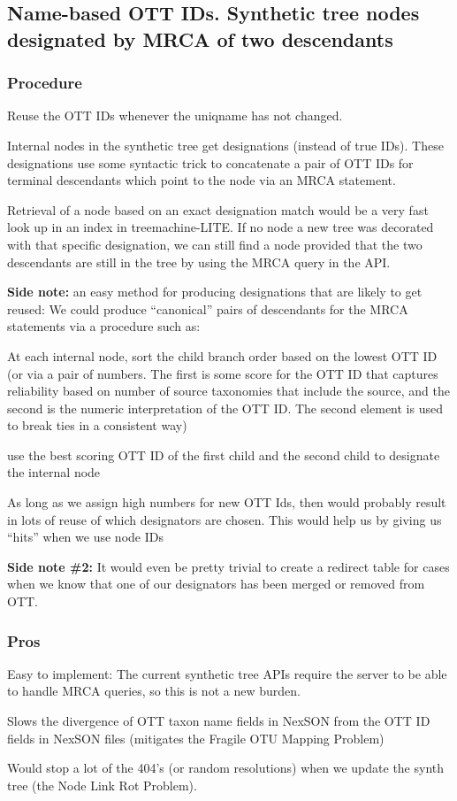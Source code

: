 \documentclass[11pt]{article}
\newcommand{\nodeLinkRot}{Node Link Rot Problem\xspace}
\newcommand{\fragileOTUMapping}{Fragile OTU Mapping Problem\xspace}
\begin{document}
\subsection{Name-based OTT IDs. Synthetic tree nodes designated by MRCA of two descendants}
\subsubsection{Procedure}
Reuse the OTT IDs whenever the uniqname has not changed.

Internal nodes in the synthetic tree get designations (instead of true IDs).
These designations use some syntactic trick to concatenate
  a pair of OTT IDs for terminal descendants which point to the node via an MRCA statement.

Retrieval of a node based on an exact designation match would be a very fast look up
  in an index in treemachine-LITE.
If no node a new tree was decorated with that specific designation, we can still
  find a node provided that the two descendants are still in the tree by using
  the MRCA query in the API.

{\bf Side note:} an easy method for producing designations that are likely to get reused:
We could produce ``canonical'' pairs of descendants for the MRCA statements
  via a procedure such as:
\begin{compactenum}
  \item At each internal node, sort the child branch order based on the lowest OTT ID (or via a pair of numbers. The first is some score 
  for the OTT ID that captures reliability based on number of source taxonomies
  that include the source, and the second is the numeric interpretation of the OTT ID.
  The second element is used to break ties in a consistent way) 
  \item use the best scoring OTT ID of the first child and the second child to designate the internal node
\end{compactenum}
As long as we assign high numbers for new OTT Ids, then would probably result in
  lots of reuse of which designators are chosen.
This would help us by giving us ``hits'' when we use node IDs

{\bf Side note \#2:} 
  It would even be pretty trivial to create a redirect table for cases
  when we know that one of our designators has been merged or removed from OTT.

\subsubsection{Pros}
\begin{compactenum}
  \item Easy to implement:
  The current synthetic tree APIs require the server to be able to handle MRCA
    queries, so this is not a new burden.
  \item Slows the divergence of OTT taxon name fields in NexSON from the OTT ID fields in NexSON files (mitigates the \fragileOTUMapping)
  \item Would stop a lot of the 404's (or random resolutions) when we update the
  synth tree (the \nodeLinkRot).
\end{compactenum}
\end{document}

